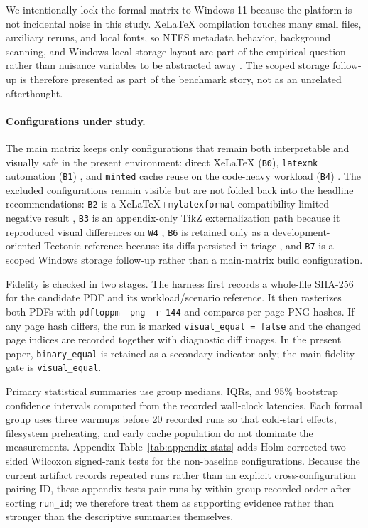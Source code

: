 \documentclass[11pt]{article}
\begin{document}
We intentionally lock the formal matrix to Windows 11 because the platform is not incidental noise in this study. XeLaTeX compilation touches many small files, auxiliary reruns, and local fonts, so NTFS metadata behavior, background scanning, and Windows-local storage layout are part of the empirical question rather than nuisance variables to be abstracted away \cite{ms-devdrive}. The scoped storage follow-up is therefore presented as part of the benchmark story, not as an unrelated afterthought.

\paragraph{Configurations under study.}
The main matrix keeps only configurations that remain both interpretable and visually safe in the present environment: direct XeLaTeX (\texttt{B0}), \texttt{latexmk} automation (\texttt{B1}) \cite{ctan-latexmk}, and \texttt{minted} cache reuse on the code-heavy workload (\texttt{B4}) \cite{ctan-minted}. The excluded configurations remain visible but are not folded back into the headline recommendations: \texttt{B2} is a XeLaTeX+\texttt{mylatexformat} compatibility-limited negative result \cite{ctan-mylatexformat}, \texttt{B3} is an appendix-only TikZ externalization path because it reproduced visual differences on \texttt{W4} \cite{ctan-pgf}, \texttt{B6} is retained only as a development-oriented Tectonic reference because its diffs persisted in triage \cite{tectonic-build}, and \texttt{B7} is a scoped Windows storage follow-up rather than a main-matrix build configuration.

Fidelity is checked in two stages. The harness first records a whole-file SHA-256 for the candidate PDF and its workload/scenario reference. It then rasterizes both PDFs with \texttt{pdftoppm -png -r 144} and compares per-page PNG hashes. If any page hash differs, the run is marked \texttt{visual\_equal = false} and the changed page indices are recorded together with diagnostic diff images. In the present paper, \texttt{binary\_equal} is retained as a secondary indicator only; the main fidelity gate is \texttt{visual\_equal}.

Primary statistical summaries use group medians, IQRs, and 95\% bootstrap confidence intervals computed from the recorded wall-clock latencies. Each formal group uses three warmups before 20 recorded runs so that cold-start effects, filesystem preheating, and early cache population do not dominate the measurements. Appendix Table~\ref{tab:appendix-stats} adds Holm-corrected two-sided Wilcoxon signed-rank tests for the non-baseline configurations. Because the current artifact records repeated runs rather than an explicit cross-configuration pairing ID, these appendix tests pair runs by within-group recorded order after sorting \texttt{run\_id}; we therefore treat them as supporting evidence rather than stronger than the descriptive summaries themselves.
\end{document}
